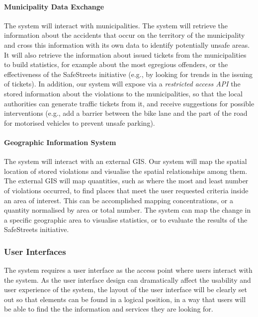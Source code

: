 \paragraph{Municipality Data Exchange} The system will interact with municipalities. The system will retrieve the information about the accidents that occur on the territory of the municipality and cross this information with its own data to identify potentially unsafe areas. It will also retrieve the information about issued tickets from the municipalities to build statistics, for example about the most egregious offenders, or the effectiveness of the SafeStreets initiative (e.g., by looking for trends in the issuing of tickets). In addition, our system will expose via a \emph{restricted access API} the stored information about the violations to the municipalities, so that the local authorities can generate traffic tickets from it, and receive suggestions for possible interventions (e.g., add a barrier between the bike lane and the part of the road for motorised vehicles to prevent unsafe parking). 
		
\paragraph{Geographic Information System} The system will interact with an external GIS. Our system will map the spatial location of stored violations and visualise the spatial relationships among them. The external GIS will map quantities, such as where the most and least number of violations occurred, to find places that meet the user requested criteria inside an area of interest. This can be accomplished mapping concentrations, or a quantity normalised by area or total number. The system can map the change in a specific geographic area to visualise statistics, or to evaluate the results of the SafeStreets initiative.	

\subsubsection{User Interfaces}

The system requires a user interface as the access point where users interact with the system. As the user interface design can dramatically affect the usability and user experience of the system, the layout of the user interface will be clearly set out so that elements can be found in a logical position, in a way that users will be able to find the the information and services they are looking for.


